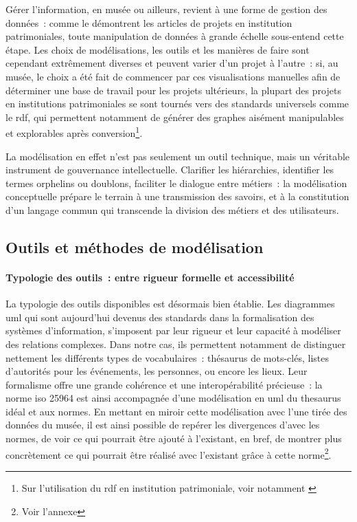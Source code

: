 Gérer l'information, en musée ou ailleurs, revient à une forme de gestion des données~: comme le démontrent les articles de projets en institution patrimoniales, toute manipulation de données à grande échelle sous-entend cette étape. Les choix de modélisations, les outils et les manières de faire sont cependant extrêmement diverses et peuvent varier d'un projet à l'autre~: si, au musée, le choix a été fait de commencer par ces visualisations manuelles afin de déterminer une base de travail pour les projets ultérieurs, la plupart des projets en institutions patrimoniales se sont tournés vers des standards universels comme le \gls{rdf}, qui permettent notamment de générer des graphes aisément manipulables et explorables après conversion\footnote{Sur l'utilisation du \gls{rdf} en institution patrimoniale, voir notamment \cite{bermesCasLierDonnees2013a,bermesConvergenceInteroperabiliteLapport2011,filabesLindexationRAMEAUAssistee2025,reichThesaurusAuGraphe2022}}.

La modélisation en effet n'est pas seulement un outil technique, mais un véritable instrument de gouvernance intellectuelle. Clarifier les hiérarchies, identifier les termes orphelins ou doublons, faciliter le dialogue entre métiers~: la modélisation conceptuelle prépare le terrain à une transmission des savoirs, et à la constitution d’un langage commun qui transcende la division des métiers et des utilisateurs.

\subsection{Outils et méthodes de modélisation}

\paragraph*{Typologie des outils~: entre rigueur formelle et accessibilité}
La typologie des outils disponibles est désormais bien établie. Les diagrammes \ac{uml} qui sont aujourd'hui devenus des standards dans la formalisation des systèmes d'information, s'imposent par leur rigueur et leur capacité à modéliser des relations complexes. Dans notre cas, ils permettent notamment de distinguer nettement les différents types de vocabulaires~: thésaurus de mots-clés, listes d'autorités pour les événements, les personnes, ou encore les lieux. Leur formalisme offre une grande cohérence et une interopérabilité précieuse~: la norme \gls{iso} 25964 est ainsi accompagnée d'une modélisation en \ac{uml} du \gls{thesaurus} idéal et aux normes. En mettant en miroir cette modélisation avec l'une tirée des données du musée, il est ainsi possible de repérer les divergences d'avec les normes, de voir ce qui pourrait être ajouté à l'existant, en bref, de montrer plus concrètement ce qui pourrait être réalisé avec l'existant grâce à cette norme\footnote{Voir l'annexe }.

